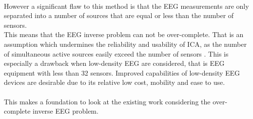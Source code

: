 \\
However a significant flaw to this method is that the EEG measurements are only separated into a number of sources that are equal or less than the number of sensors.
\\
This means that the EEG inverse problem can not be over-complete. That is an assumption which undermines the reliability and usability of ICA, as the number of simultaneous active sources easily exceed the number of sensors \cite{phd2015}. This is especially a drawback when low-density EEG are considered, that is EEG equipment with less than 32 sensors. Improved capabilities of low-density EEG devices are desirable due to its relative low cost, mobility and ease to use. 
\\  
\\
This makes a foundation to look at the existing work considering the over-complete inverse EEG problem. 

